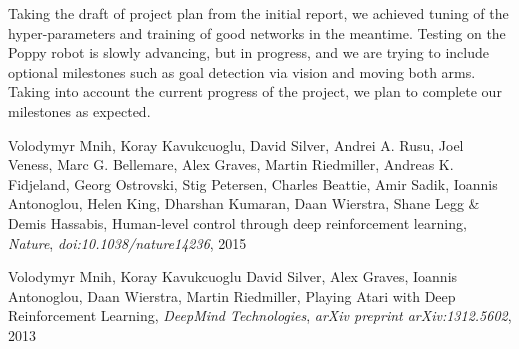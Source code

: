 \documentclass{article}
\begin{document}
Taking the draft of project plan from the initial report, we achieved tuning of the hyper-parameters and training of good networks in the meantime. Testing on the Poppy robot is slowly advancing, but in progress, and we are trying to include optional milestones such as goal detection via vision and moving both arms. 
Taking into account the current progress of the project, we plan to complete our milestones as expected. 




\newpage

\begin{thebibliography}{9}






Volodymyr Mnih, Koray Kavukcuoglu, David Silver, Andrei A. Rusu, Joel Veness, Marc G. Bellemare, Alex Graves, Martin Riedmiller, Andreas K. Fidjeland, Georg Ostrovski, Stig Petersen, Charles Beattie, Amir Sadik, Ioannis Antonoglou, Helen King, Dharshan Kumaran, Daan Wierstra, Shane Legg
\& Demis Hassabis, Human-level control through deep reinforcement
learning, \textit{Nature}, \textit{doi:10.1038/nature14236}, 2015

Volodymyr Mnih, Koray Kavukcuoglu   David Silver, Alex Graves, Ioannis Antonoglou, Daan Wierstra, Martin Riedmiller, Playing Atari with Deep Reinforcement Learning, \textit{DeepMind Technologies}, \textit{arXiv preprint arXiv:1312.5602}, 2013


\end{thebibliography}
\end{document}
